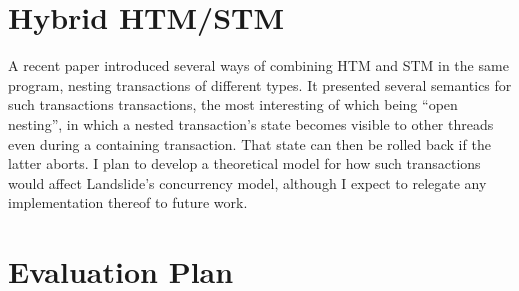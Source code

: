 \section{Hybrid HTM/STM}

A recent paper \cite{hybrid-htm-stm} introduced several ways of combining HTM and STM in the same program, nesting transactions of different types.
It presented several semantics for such transactions transactions, the most interesting of which being ``open nesting'', in which a nested transaction's state becomes visible to other threads even during a containing transaction.
That state can then be rolled back if the latter aborts.
I plan to develop a theoretical model for how such transactions would affect Landslide's concurrency model,
although I expect to relegate any implementation thereof to future work.

\section{Evaluation Plan}


